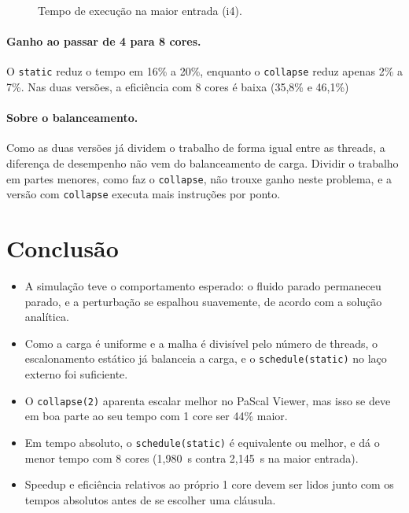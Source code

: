 \documentclass[a4paper,12pt]{article}
\begin{document}
\begin{figure}[ht]
\centering
{}
\caption{Tempo de execução na maior entrada (i4).}
\label{fig:tempo}
\end{figure}

\paragraph{Ganho ao passar de 4 para 8 cores.} O \texttt{static} reduz o tempo
em 16\% a 20\%, enquanto o \texttt{collapse} reduz apenas 2\% a 7\%. Nas duas
versões, a eficiência com 8 cores é baixa (35,8\% e 46,1\%)

\paragraph{Sobre o balanceamento.} Como as duas versões já dividem o trabalho
de forma igual entre as threads, a diferença de desempenho não vem do
balanceamento de carga. Dividir o trabalho em partes menores, como faz o
\texttt{collapse}, não trouxe ganho neste problema, e a versão com
\texttt{collapse} executa mais instruções por ponto.

\section{Conclusão}

\begin{itemize}
    \item A simulação teve o comportamento esperado: o fluido parado permaneceu
    parado, e a perturbação se espalhou suavemente, de acordo com a solução
    analítica.
    \item Como a carga é uniforme e a malha é divisível pelo número de threads,
    o escalonamento estático já balanceia a carga, e o \texttt{schedule(static)}
    no laço externo foi suficiente.
    \item O \texttt{collapse(2)} aparenta escalar melhor no PaScal Viewer, mas
    isso se deve em boa parte ao seu tempo com 1 core ser 44\% maior.
    \item Em tempo absoluto, o \texttt{schedule(static)} é equivalente ou
    melhor, e dá o menor tempo com 8 cores (1,980~s contra 2,145~s na maior
    entrada).
    \item Speedup e eficiência relativos ao próprio 1 core devem ser lidos junto
    com os tempos absolutos antes de se escolher uma cláusula.
\end{itemize}
\end{document}

